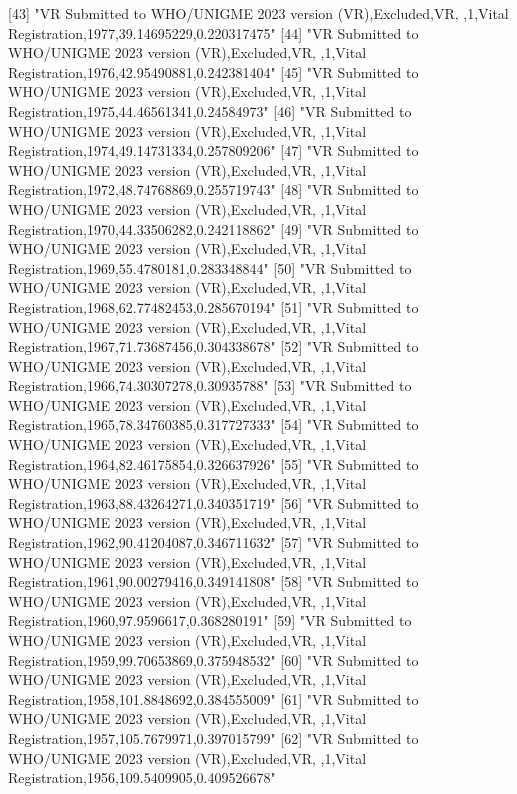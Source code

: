  [43] "VR Submitted to WHO/UNIGME 2023 version (VR),Excluded,VR, ,1,Vital Registration,1977,39.14695229,0.220317475"                 
 [44] "VR Submitted to WHO/UNIGME 2023 version (VR),Excluded,VR, ,1,Vital Registration,1976,42.95490881,0.242381404"                 
 [45] "VR Submitted to WHO/UNIGME 2023 version (VR),Excluded,VR, ,1,Vital Registration,1975,44.46561341,0.24584973"                  
 [46] "VR Submitted to WHO/UNIGME 2023 version (VR),Excluded,VR, ,1,Vital Registration,1974,49.14731334,0.257809206"                 
 [47] "VR Submitted to WHO/UNIGME 2023 version (VR),Excluded,VR, ,1,Vital Registration,1972,48.74768869,0.255719743"                 
 [48] "VR Submitted to WHO/UNIGME 2023 version (VR),Excluded,VR, ,1,Vital Registration,1970,44.33506282,0.242118862"                 
 [49] "VR Submitted to WHO/UNIGME 2023 version (VR),Excluded,VR, ,1,Vital Registration,1969,55.4780181,0.283348844"                  
 [50] "VR Submitted to WHO/UNIGME 2023 version (VR),Excluded,VR, ,1,Vital Registration,1968,62.77482453,0.285670194"                 
 [51] "VR Submitted to WHO/UNIGME 2023 version (VR),Excluded,VR, ,1,Vital Registration,1967,71.73687456,0.304338678"                 
 [52] "VR Submitted to WHO/UNIGME 2023 version (VR),Excluded,VR, ,1,Vital Registration,1966,74.30307278,0.30935788"                  
 [53] "VR Submitted to WHO/UNIGME 2023 version (VR),Excluded,VR, ,1,Vital Registration,1965,78.34760385,0.317727333"                 
 [54] "VR Submitted to WHO/UNIGME 2023 version (VR),Excluded,VR, ,1,Vital Registration,1964,82.46175854,0.326637926"                 
 [55] "VR Submitted to WHO/UNIGME 2023 version (VR),Excluded,VR, ,1,Vital Registration,1963,88.43264271,0.340351719"                 
 [56] "VR Submitted to WHO/UNIGME 2023 version (VR),Excluded,VR, ,1,Vital Registration,1962,90.41204087,0.346711632"                 
 [57] "VR Submitted to WHO/UNIGME 2023 version (VR),Excluded,VR, ,1,Vital Registration,1961,90.00279416,0.349141808"                 
 [58] "VR Submitted to WHO/UNIGME 2023 version (VR),Excluded,VR, ,1,Vital Registration,1960,97.9596617,0.368280191"                  
 [59] "VR Submitted to WHO/UNIGME 2023 version (VR),Excluded,VR, ,1,Vital Registration,1959,99.70653869,0.375948532"                 
 [60] "VR Submitted to WHO/UNIGME 2023 version (VR),Excluded,VR, ,1,Vital Registration,1958,101.8848692,0.384555009"                 
 [61] "VR Submitted to WHO/UNIGME 2023 version (VR),Excluded,VR, ,1,Vital Registration,1957,105.7679971,0.397015799"                 
 [62] "VR Submitted to WHO/UNIGME 2023 version (VR),Excluded,VR, ,1,Vital Registration,1956,109.5409905,0.409526678"                 

